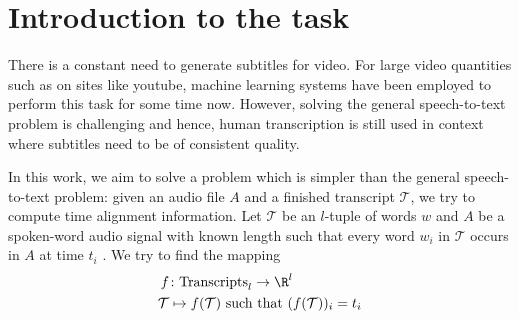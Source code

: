 \chapter{Introduction to the task}

There is a constant need to generate subtitles for video. For large video quantities such as on sites like youtube, machine learning systems have been employed to perform this task for some time now. However, solving the general speech-to-text problem is challenging and hence, human transcription is still used in context where subtitles need to be of consistent quality.

In this work, we aim to solve a problem which is simpler than the general speech-to-text problem: given an audio file $A$ and a finished transcript $\mathcal{T}$, we try to compute time alignment information. Let $\mathcal{T}$ be an $l$-tuple of words $w$ and $A$ be a spoken-word audio signal with known length such that every word $w_i$ in $\mathcal{T}$ occurs in $A$ at time $t_i$ . We try to find the mapping
\begin{align}
	f&\colon\textrm{Transcripts}_l\to\R^l\\
	\mathcal{T}&\mapsto f(\mathcal{T})\textrm{ such that }(f(\mathcal{T}))_i=t_i
\end{align}